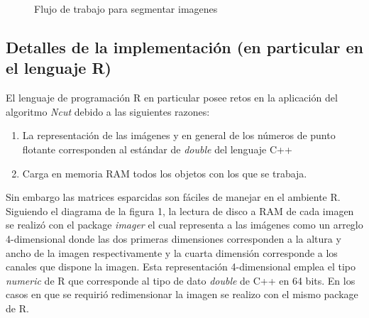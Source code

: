 \documentclass[conference]{IEEEtran}
\begin{document}
\begin{figure}[htbp]
\caption{Flujo de trabajo para segmentar imagenes}
\label{workflow}
\end{figure}
\subsection{Detalles de la implementación (en particular en el lenguaje R)}
El lenguaje de programación R en particular posee retos en la aplicación del algoritmo \textit{Ncut} debido a las siguientes razones: 
\begin{enumerate}
\item La representación de las imágenes y en general de los números de punto flotante corresponden al estándar de \textit{double} del lenguaje C++
\item Carga en memoria RAM todos los objetos con los que se trabaja. 
\end{enumerate}
Sin embargo las matrices esparcidas son fáciles de manejar en el ambiente R.\\
Siguiendo el diagrama de la figura 1, la lectura de disco a RAM de cada imagen se realizó con el package \textit{imager} \cite{imager} el cual representa a las imágenes como un arreglo 4-dimensional donde las dos primeras dimensiones corresponden a la altura y ancho de la imagen respectivamente y la cuarta dimensión corresponde a los canales que dispone la imagen. Esta representación 4-dimensional emplea el tipo \textit{numeric} de R que corresponde al tipo de dato \textit{double} de C++ en 64 bits. En los casos en que se requirió redimensionar la imagen se realizo con el mismo package de R.\\
\end{document}
